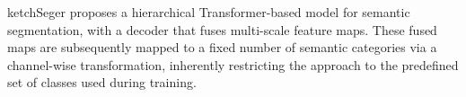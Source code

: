 






ketchSeger \cite{yang2023sceneHierTransformer} proposes a hierarchical Transformer-based model for semantic segmentation, with a decoder that fuses multi-scale feature maps. These fused maps are subsequently mapped to a fixed number of semantic categories via a channel-wise transformation, inherently restricting the approach to the predefined set of classes used during training.